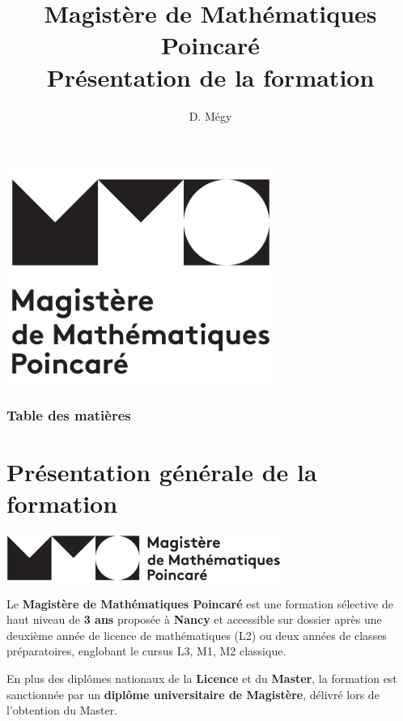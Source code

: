 \documentclass[slidetop,11pt]{beamer}
\title{Magistère de Mathématiques Poincaré\\ Présentation de la formation}
\author{D. Mégy}
\begin{document}
  

\begin{frame}
\begin{center}
\includegraphics[height=7cm]{images/Logo-MMP-noir-cropped}
\end{center}
\end{frame}  

\begin{frame}
\frametitle{Table des matières}
\tableofcontents
\end{frame}

\section{Présentation générale de la formation}

\begin{frame}
\begin{center}
\includegraphics[height=1.5cm]{images/Logo-MMP-noir-2}
\end{center}
Le \textbf{Magistère de Mathématiques Poincaré} est une formation sélective de haut niveau de \textbf{3 ans} proposée à \textbf{Nancy} et accessible sur dossier après une deuxième année de licence de mathématiques (L2) ou deux années de classes préparatoires, englobant le cursus L3, M1, M2 classique.
\bigskip

En plus des diplômes nationaux de la \textbf{Licence} et du \textbf{Master}, la formation est sanctionnée par un \textbf{diplôme universitaire de Magistère}, délivré lors de l'obtention du Master.
\end{frame}
\end{document}
